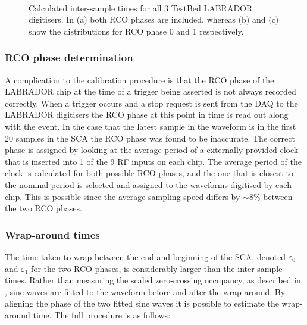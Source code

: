 \begin{figure}[htpb]
  \\
  \hfill
  \caption{Calculated inter-sample times for all 3 TestBed LABRADOR digitisers. In (a) both RCO phases are included, whereas (b) and (c) show the distributions for RCO phase 0 and 1 respectively.}
  \label{fig:calibration:LABRADOR-Digitiser-Chip:Inter-sample-times}
\end{figure}

\subsubsection{RCO phase determination}
\label{sec:calibration:LABRADOR-Digitiser-Chip:RCO-phase-determination}

A complication to the calibration procedure is that the RCO phase of the LABRADOR chip at the time of a trigger being asserted is not always recorded correctly. When a trigger occurs and a stop request is sent from the DAQ to the LABRADOR digitisers the RCO phase at this point in time is read out along with the event. In the case that the latest sample in the waveform is in the first 20 samples in the SCA the RCO phase was found to be inaccurate. The correct phase is assigned by looking at the average period of a externally provided clock that is inserted into 1 of the 9 RF inputs on each chip. The average period of the clock is calculated for both possible RCO phases, and the one that is closest to the nominal period is selected and assigned to the waveforms digitised by each chip. This is possible since the average sampling speed differs by $\sim 8 \%$ between the two RCO phases.


\subsubsection{Wrap-around times}
\label{sec:calibration:LABRADOR-Digitiser-Chip:Wrap-around-times}

The time taken to wrap between the end and beginning of the SCA, denoted $\varepsilon_{0}$ and $\varepsilon_{1}$ for the two RCO phases, is considerably larger than the inter-sample times. Rather than measuring the scaled zero-crossing occupancy, as described in , sine waves are fitted to the waveform before and after the wrap-around. By aligning the phase of the two fitted sine waves it is possible to estimate the wrap-around time. The full procedure is as follows:

